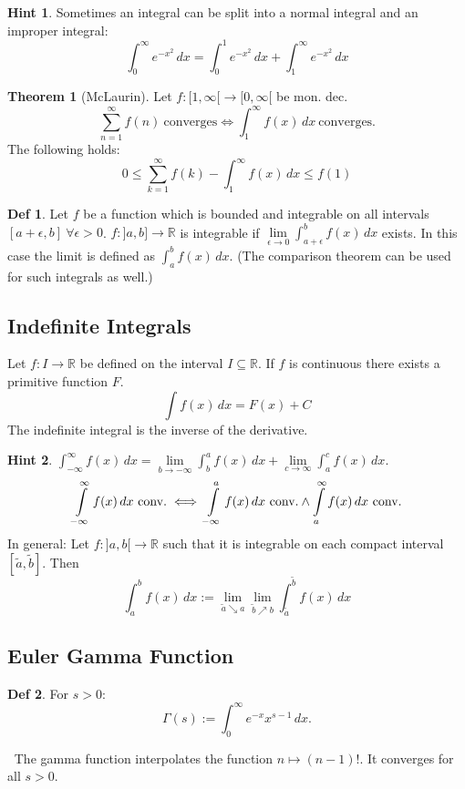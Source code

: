 \documentclass[a4paper, 10pt]{article}
\theoremstyle{definition}
\newtheorem*{definition}{Def}
\newtheorem*{note_wrapper}{Hint}
\theoremstyle{ex}
\theoremstyle{named}
\newtheorem*{ntheorem_wrapper}{Theorem}
\newenvironment{ntheorem}%
    {\begin{mdframed}[style=important]\begin{ntheorem_wrapper}}%
    {\end{ntheorem_wrapper}\end{mdframed}}
\newenvironment{note}%
    {\begin{mdframed}[style=trick]\begin{note_wrapper}}%
    {\end{note_wrapper}\end{mdframed}}
\newcommand{\R}{\mathbb{R}}
\begin{document}
\begin{note}
    Sometimes an integral can be split into a normal integral and an improper integral:
    $$\int_0^\infty e^{-x^2} \,dx = \int_0^1 e^{-x^2} \,dx + \int_1^\infty e^{-x^2} \,dx$$
\end{note}

\begin{ntheorem}[McLaurin]
    Let $f: [1, \infty[ \to [0, \infty[$ be mon. dec.
    $$\sum_{n=1}^\infty f(n) \ \text{converges} \iff \int_1^\infty f(x) \,dx \ \text{converges}.$$ 
    The following holds:
    $$0 \leq \sum_{k=1}^\infty f(k) - \int_1^\infty f(x) \,dx \leq f(1)$$
\end{ntheorem}

\begin{definition}
    Let $f$ be a function which is bounded and integrable on all intervals $[a + \epsilon, b] \ \forall \epsilon > 0$. $f: ]a, b] \to \R$ is integrable if $\lim\limits_{\epsilon \to 0} \int_{a + \epsilon}^b f(x) \,dx$ exists. In this case the limit is defined as $\int_a^b f(x) \,dx$. (The comparison theorem can be used for such integrals as well.)
\end{definition}

\subsection{Indefinite Integrals}
Let $f: I \to \R$ be defined on the interval $I \subseteq \R$. If $f$ is continuous there exists a primitive function $F$.
$$\int f(x) \,dx = F(x) + C$$
The indefinite integral is the inverse of the derivative.

\begin{note}
    $\int_{-\infty}^\infty f(x) \,dx = \lim\limits_{b \to - \infty} \int_b^a f(x) \,dx + \lim\limits_{c \to \infty} \int_a^c f(x) \,dx$.
    $$\int\displaylimits_{-\infty}^\infty f(x) \,dx \ \text{conv.} \iff \int\displaylimits_{-\infty}^a f(x) \,dx \ \text{conv.} \land \int\displaylimits_a^\infty f(x) \,dx \ \text{conv.}$$
    In general: Let $f: ]a, b[ \to \R$ such that it is integrable on each compact interval $[\tilde{a}, \tilde{b}]$. Then 
    $$\int_a^b f(x) \,dx := \lim\limits_{\tilde{a} \searrow a}\lim\limits_{\tilde{b} \nearrow b} \int_{\tilde{a}}^{\tilde{b}} f(x) \,dx$$
\end{note}

\subsection{Euler Gamma Function}
\begin{definition}
    For $s > 0$:
    $$\Gamma(s) := \int_0^\infty e^{-x}x^{s - 1} \,dx.$$
\end{definition}
$\ $ \newline The gamma function interpolates the function $n \mapsto (n-1)!$. It converges for all $s > 0$.
\pagebreak
\end{document}
